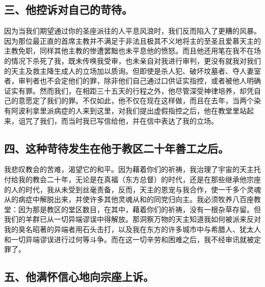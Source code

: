 
\subsection{三、他控诉对自己的苛待。}

因为当我们期望通过你的圣座派往的人平息风浪时，我们反而陷入了更糟的风暴。因为那位最正直的首席主教并不满足于非法且极其不义地将主的至圣且爱慕天主的主教免职，同样其他主教的惨遭罢黜也未平息他的愤怒。而且他还用笔在我不在场的情况下杀死了我，既未传唤我受审，也未亲自对我进行审判，更没有就我对我们的天主及救主降生成人的立场加以质询。但即使是杀人犯、破坏坟墓者、夺人妻室者，审判者也不会定他们的罪，除非他们自己通过口供证实指控，或者被他人明确证实有罪。然而我们，在相距三十五天的行程之外，他尽管深受神律培养，却凭自己的意愿定了我们的罪。不仅如此，他不仅在现在这样做，而且在去年，当两个染有阿波利拿里派病症的人来到这里，对我们提出虚假指控之后，他在教堂里站起来，诅咒了我们，而当时我已写信给他，并在信中表达了我的立场。\par


\subsection{四、这种苛待发生在他于教区二十年善工之后。}

我悲叹教会的苦难，渴望它的和平。因为藉着你们的祈祷，我治理了宇宙的天主托付给我的教会二十年，无论是在真福（东方总督）的时代，还是在那些继承他宗座的人的时代，我从未受到丝毫责备，反而，天主的恩宠与我合作，使一千多个灵魂从的病症中解脱出来，并使许多其他灵魂从和的同党归向主。我必须牧养八百座教堂：因为那是教区的堂区数目，在其中，藉着你们的祈祷，没有一根杂草存留。但我们的羊群已从一切异端谬误中得解放。那洞察万物的天主知道我如何被派来反对我的臭名昭著的异端者用石头击打，以及我在东方的许多城市中与希腊人、犹太人和一切异端谬误进行过何等斗争。而在这一切辛劳和困难之后，我不经审讯就被定罪了。\par


\subsection{五、他满怀信心地向宗座上诉。}


